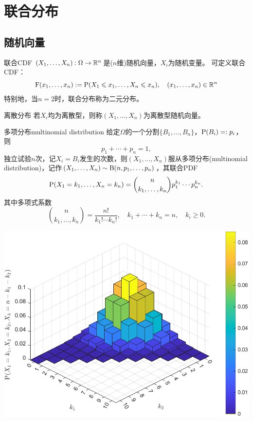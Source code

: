 \chapter{联合分布}

\section{随机向量}

\begin{definition}{联合CDF}{}
	$(X_1,\ldots,X_n):\Omega\to\RR^n$是($n$维)随机向量，$X_i$为随机变量。
	可定义联合CDF：
	\[
		\CDF(x_1,\ldots,x_n):=\P(X_1\leqslant x_1,\ldots,X_n\leqslant x_n),\quad(x_1,\ldots,x_n)\in\RR^n
	\]
	特别地，当$n=2$时，联合分布称为二元分布。
\end{definition}

\begin{definition}
	{离散分布}{}	
	若$X_i$均为离散型，则称$(X_1,\ldots,X_n)$为离散型随机向量。
\end{definition}

\begin{example}{多项分布}{multinomial distribution}
	给定$\Omega$的一个分割$\{B_1,\ldots,B_n\}$，$\P(B_i)=:p_i$，则 
	\[
		p_1+\cdots+p_n=1,
	\]
	独立试验$n$次，记$X_i=B_i$发生的次数，则$(X_1,\ldots,X_n)$服从多项分布(multinomial distribution)，记作$(X_1,\ldots,X_n)\sim\Bino(n,p_1,\ldots,p_n)$，其联合PDF
	\begin{equation}
		\P(X_1=k_1,\ldots,X_n=k_n)=\binom{n}{k_1,\ldots,k_n}p_1^{k_1}\cdots p_n^{k_n}.
	\end{equation}
	其中多项式系数
	\begin{equation}
		\label{eq:multinomial coefficient}
		\binom{n}{k_1,\ldots,k_n}=\frac{n!}{k_1!\cdots k_n!},\quad k_1+\cdots+k_n=n,\quad k_i\geqslant 0.
	\end{equation}
	\begin{center}
		\includegraphics[width=.9\textwidth]{figures/pdf_bin3.pdf}
		\label{fig:pdf_bin3}
	\end{center}
\end{example} 

